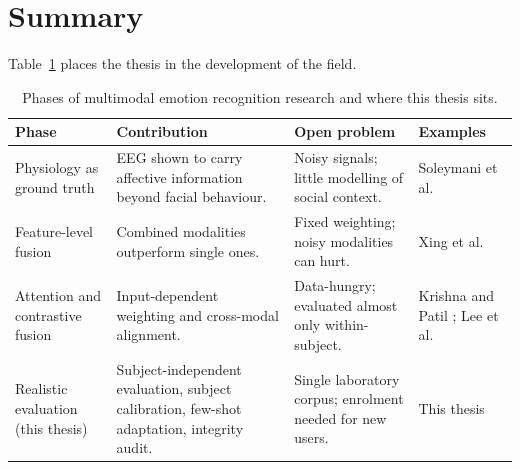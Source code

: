 \section{Summary}
Table~\ref{tab:research_evolution_p2} places the thesis in the development of the field.

\begin{table}[htbp]
\centering
\small
\caption{Phases of multimodal emotion recognition research and where this thesis sits.}
\label{tab:research_evolution_p2}
\begin{tabular}{p{3.0cm} p{4.1cm} p{3.7cm} p{3.0cm}}
\hline
\textbf{Phase} & \textbf{Contribution} & \textbf{Open problem} & \textbf{Examples} \\
\hline
Physiology as ground truth & EEG shown to carry affective information beyond facial behaviour. & Noisy signals; little modelling of social context. & Soleymani et al.\ \cite{Soleymani2016EEGFacial} \\
\hline
Feature-level fusion & Combined modalities outperform single ones. & Fixed weighting; noisy modalities can hurt. & Xing et al.\ \cite{Xing2019EEGAudioVisual} \\
\hline
Attention and contrastive fusion & Input-dependent weighting and cross-modal alignment. & Data-hungry; evaluated almost only within-subject. & Krishna and Patil \cite{KrishnaPatil2020Interspeech}; Lee et al.\ \cite{Lee2024MERCL} \\
\hline
Realistic evaluation (this thesis) & Subject-independent evaluation, subject calibration, few-shot adaptation, integrity audit. & Single laboratory corpus; enrolment needed for new users. & This thesis \\
\hline
\end{tabular}
\end{table}
